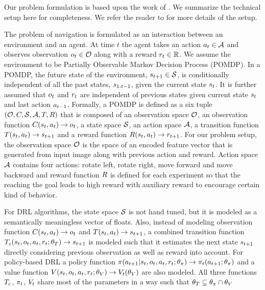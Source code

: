 Our problem formulation is based upon the work of \cite{MiPaViICLR2017}. We summarize the technical setup here for completeness.
We refer the reader to \cite{MnBaMiICML2016,MiPaViICLR2017} for more details of the setup.

The problem of navigation is formulated as an interaction between an environment and an agent.
At time $t$ the agent takes an action $a_t \in \mathcal{A}$ and observes observation $o_t \in \mathcal{O}$ along with a reward $r_t \in \mathbb{R}$.
We assume the environment to be Partially Observable Markov Decision Process (POMDP).
In a POMDP, the future state of the environment, $s_{t+1} \in \mathcal{S}$, is conditionally independent of all the past states, $s_{1:t-1}$, given the current state $s_t$. It is further assumed that
$o_t$ and $r_t$ are independent of previous states given current state $s_t$ and last action $a_{t-1}$.
Formally, a POMDP is defined as a six tuple $(\mathcal{O}, C, \mathcal{S}, \mathcal{A}, T, R)$ that is composed of an observation space $\mathcal{O}$, an observation function $C(s_t, a_t) \rightarrow o_t$, a state space $\mathcal{S}$, an action space $\mathcal{A}$, a transition function $T(s_t, a_t) \rightarrow s_{t+1}$ and a reward function $R(s_t, a_t) \rightarrow r_{t+1}$.
For our problem setup, the observation space $\mathcal{O}$ is the space of an encoded feature vector that is generated from input image along with previous action and reward.
Action space $\mathcal{A}$ contains four actions: rotate left, rotate right, move forward and move backward and reward function $R$ is defined for each experiment so that the reaching the goal leads to high reward with auxiliary reward to encourage certain kind of behavior.

For DRL algorithms, the state space $\mathcal{S}$ is not hand tuned, but it is modeled as a semantically meaningless vector of floats.
Also, instead of modeling observation function $C(s_t, a_t) \rightarrow o_t$ and $T(s_t, a_t) \rightarrow s_{t+1}$, a combined transition function $T_c(s_t, o_t, a_t, r_t; \theta_T) \rightarrow s_{t+1}$ is modeled such that it estimates the next state $s_{t+1}$ directly considering previous observation as well as reward into account.
For policy-based DRL a policy function $\pi(a_{t+1}|s_t, o_t, a_t, r_t; \theta_\pi) \rightarrow \pi_t(a_{t+1} ; \theta_\pi)$ and a value function $V(s_t, o_t, a_t, r_t; \theta_V) \rightarrow V_t(\theta_V)$ are also modeled.
All three functions $T_c$, $\pi_t$, $V_t$ share most of the parameters in a way such that $\theta_T \subseteq \theta_{\pi} \cap \theta_V$

